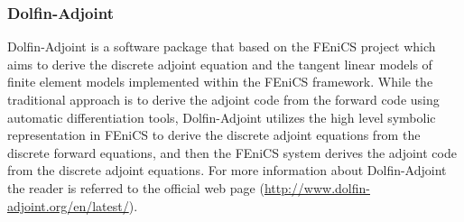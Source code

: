   

\subsubsection{Dolfin-Adjoint}

Dolfin-Adjoint \cite{farrell2013automated} is a software package that
based on the FEniCS project 
which aims to derive the discrete adjoint equation and the tangent
linear models of finite element models implemented within the FEniCS
framework. While the traditional approach is to derive the adjoint code
from the forward code using automatic differentiation tools,
Dolfin-Adjoint utilizes the high level symbolic representation
\cite{alnaes2014unified} in FEniCS to derive the discrete adjoint
equations from the discrete forward equations, and then the FEniCS
system derives the adjoint code from the discrete adjoint equations. 
For more information about Dolfin-Adjoint the reader is referred to
the official web page (\url{http://www.dolfin-adjoint.org/en/latest/}).

